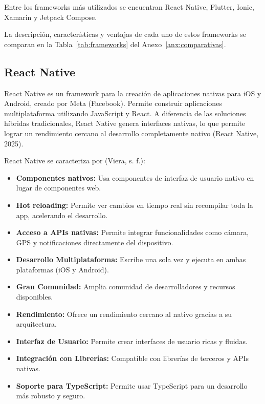 Entre los frameworks más utilizados se encuentran React Native, Flutter, Ionic,
Xamarin y Jetpack Compose.

La descripción, características y ventajas de cada uno de estos frameworks se comparan en la Tabla~\ref{tab:frameworks} del Anexo~\ref{anx:comparativas}.

\subsection{React Native}

React Native es un framework para la creación de aplicaciones nativas para iOS
y Android, creado por Meta (Facebook). Permite construir aplicaciones
multiplataforma utilizando JavaScript y React. A diferencia de las soluciones
híbridas tradicionales, React Native genera interfaces nativas, lo que permite
lograr un rendimiento cercano al desarrollo completamente nativo (React Native,
2025).

React Native se caracteriza por (Viera, s. f.):

\begin{itemize}
    \item \textbf{Componentes nativos:} Usa componentes de interfaz de usuario
    nativo en lugar de componentes web.
    \item \textbf{Hot reloading:} Permite ver cambios en tiempo real sin
    recompilar toda la app, acelerando el desarrollo.
    \item \textbf{Acceso a APIs nativas:} Permite integrar funcionalidades como
    cámara, GPS y notificaciones directamente del dispositivo.
    \item \textbf{Desarrollo Multiplataforma:} Escribe una sola vez y ejecuta en
    ambas plataformas (iOS y Android).
    \item \textbf{Gran Comunidad:} Amplia comunidad de desarrolladores y recursos
    disponibles.
    \item \textbf{Rendimiento:} Ofrece un rendimiento cercano al nativo gracias a
    su arquitectura.
    \item \textbf{Interfaz de Usuario:} Permite crear interfaces de usuario ricas
    y fluidas.
    \item \textbf{Integración con Librerías:} Compatible con librerías de
    terceros y APIs nativas.
    \item \textbf{Soporte para TypeScript:} Permite usar TypeScript para un
    desarrollo más robusto y seguro.
\end{itemize}

